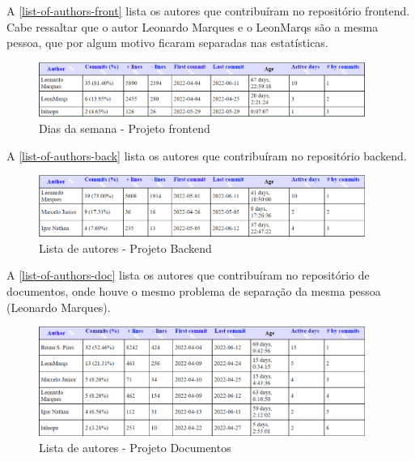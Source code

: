 A \autoref{list-of-authors-front} lista os autores que contribuíram no repositório \gls{frontend}. Cabe ressaltar que o autor Leonardo Marques e o LeonMarqs são a mesma pessoa, que por algum motivo ficaram separadas nas estatísticas.
\begin{figure}[H]
	\centering
	\caption{\label{list-of-authors-front}Dias da semana - Projeto \gls{frontend}}
	\includegraphics[width=0.95\textwidth]{../imagens/stats/list-of-authors-frontend.png}
\end{figure}

A \autoref{list-of-authors-back} lista os autores que contribuíram no repositório backend.
\begin{figure}[H]
	\centering
	\caption{\label{list-of-authors-back}Lista de autores - Projeto Backend}
	\includegraphics[width=0.95\textwidth]{../imagens/stats/list-of-authors-backend.png}
\end{figure}

A \autoref{list-of-authors-doc} lista os autores que contribuíram no repositório de documentos, onde houve o mesmo problema de separação da mesma pessoa (Leonardo Marques).
\begin{figure}[H]
	\centering
	\caption{\label{list-of-authors-doc}Lista de autores - Projeto Documentos}
	\includegraphics[width=0.95\textwidth]{../imagens/stats/list-of-authors-documentos.png}
\end{figure}

